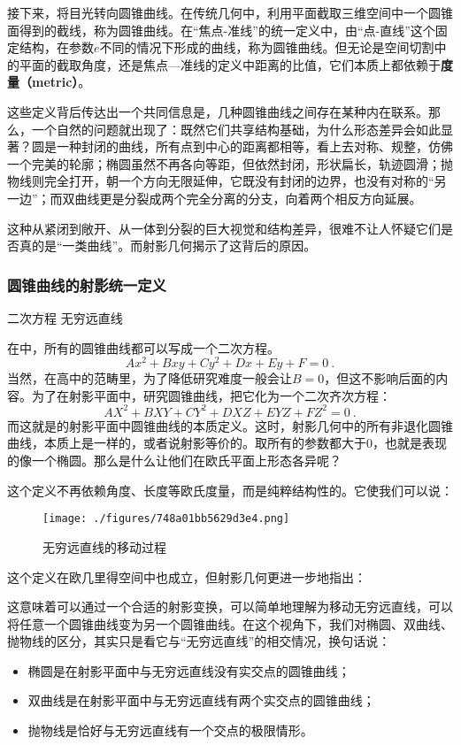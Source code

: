 接下来，将目光转向圆锥曲线。在传统几何中，利用平面截取三维空间中一个圆锥面得到的截线，称为圆锥曲线。在“焦点-准线”的统一定义中，由“点-直线”这个固定结构，在参数$e$不同的情况下形成的曲线，称为圆锥曲线。但无论是空间切割中的平面的截取角度，还是焦点—准线的定义中距离的比值，它们本质上都依赖于\textbf{度量（metric）}。

这些定义背后传达出一个共同信息是，几种圆锥曲线之间存在某种内在联系。那么，一个自然的问题就出现了：既然它们共享结构基础，为什么形态差异会如此显著？圆是一种封闭的曲线，所有点到中心的距离都相等，看上去对称、规整，仿佛一个完美的轮廓；椭圆虽然不再各向等距，但依然封闭，形状扁长，轨迹圆滑；抛物线则完全打开，朝一个方向无限延伸，它既没有封闭的边界，也没有对称的“另一边”；而双曲线更是分裂成两个完全分离的分支，向着两个相反方向延展。

这种从紧闭到敞开、从一体到分裂的巨大视觉和结构差异，很难不让人怀疑它们是否真的是“一类曲线”。而射影几何揭示了这背后的原因。

\subsubsection{圆锥曲线的射影统一定义}

二次方程
无穷远直线

在中，所有的圆锥曲线都可以写成一个二次方程。
\begin{equation}
Ax^2+Bxy+Cy^2+Dx+Ey+F=0~.
\end{equation}
当然，在高中的范畴里，为了降低研究难度一般会让$B=0$，但这不影响后面的内容。为了在射影平面中，研究圆锥曲线，把它化为一个二次齐次方程：
\begin{equation}
AX^2 + BXY + CY^2 + DXZ + EYZ + FZ^2 = 0~.
\end{equation}
而这就是的射影平面中圆锥曲线的本质定义。这时，射影几何中的所有非退化圆锥曲线，本质上是一样的，或者说射影等价的。取所有的参数都大于0，也就是表现的像一个椭圆。那么是什么让他们在欧氏平面上形态各异呢？

这个定义不再依赖角度、长度等欧氏度量，而是纯粹结构性的。它使我们可以说：



\begin{figure}[ht]
\centering
\texttt{[image: ./figures/748a01bb5629d3e4.png]}
\caption{无穷远直线的移动过程} \label{fig_HsPGCC_3}
\end{figure}

这个定义在欧几里得空间中也成立，但射影几何更进一步地指出：

这意味着可以通过一个合适的射影变换，可以简单地理解为移动无穷远直线，可以将任意一个圆锥曲线变为另一个圆锥曲线。在这个视角下，我们对椭圆、双曲线、抛物线的区分，其实只是看它与“无穷远直线”的相交情况，换句话说：
\begin{itemize}
\item 椭圆是在射影平面中与无穷远直线没有实交点的圆锥曲线；
\item 双曲线是在射影平面中与无穷远直线有两个实交点的圆锥曲线；
\item 抛物线是恰好与无穷远直线有一个交点的极限情形。
\end{itemize}

